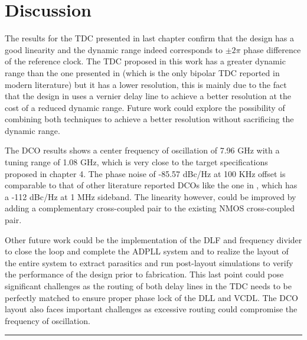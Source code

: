 \chapter{Discussion}

The results for the TDC presented in last chapter confirm that the design has a good linearity and the dynamic range indeed corresponds to $\pm 2 \pi$ phase difference of the reference clock.
The TDC proposed in this work has a greater dynamic range than the one presented in \cite{MohammadAmin2022} (which is the only bipolar TDC reported in modern literature) but it has a lower resolution, 
this is mainly due to the fact that the design in \cite{MohammadAmin2022} uses a vernier delay line to achieve a better resolution at the cost of a reduced dynamic range. Future work could explore
the possibility of combining both techniques to achieve a better resolution without sacrificing the dynamic range.

The DCO results shows a center frequency of oscillation of 7.96 GHz with a tuning range of 1.08 GHz, which is very close to the target specifications proposed in chapter 4. The
phase noise of -85.57 dBc/Hz at 100 KHz offset is comparable to that of other literature reported DCOs like the one in \cite{DCO_Chen2023}, which has a -112 dBc/Hz at 1 MHz sideband.
The linearity however, could be improved by adding a complementary cross-coupled pair to the existing NMOS cross-coupled pair.

Other future work could be the implementation of the DLF and frequency divider to close the loop and complete the ADPLL system and to realize the layout of the entire system 
to extract parasitics and run post-layout simulations to verify the performance of the design prior to fabrication. This last point could pose significant challenges as the
routing of both delay lines in the TDC needs to be perfectly matched to ensure proper phase lock of the DLL and VCDL. The DCO layout also faces important challenges as excessive
routing could compromise the frequency of oscillation.

\noindent\rule{\textwidth}{1pt}